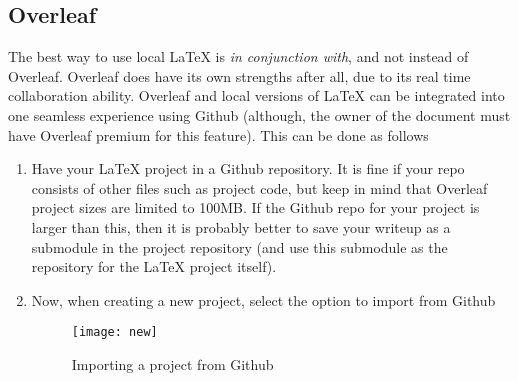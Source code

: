 \graphicspath{{Parts/3_Integrations/graphics/}}
\subsection{Overleaf}
The best way to use local \LaTeX{} is \emph{in conjunction with}, and not instead of Overleaf. Overleaf does have its own strengths after all, due to its real time collaboration ability. Overleaf and local versions of \LaTeX{} can be integrated into one seamless experience using Github (although, the owner of the document must have Overleaf premium for this feature). This can be done as follows
\begin{enumerate}
    \item Have your \LaTeX{} project in a Github repository. It is fine if your repo consists of other files such as project code, but keep in mind that Overleaf project sizes are limited to 100MB. If the Github repo for your project is larger than this, then it is probably better to save your writeup as a submodule in the project repository (and use this submodule as the repository for the \LaTeX{} project itself).
    \item Now, when creating a new project, select the option to import from Github
    \begin{figure}[ht!]
        \centering
        \texttt{[image: new]}
        \caption{Importing a project from Github}
    \end{figure}
\end{enumerate}